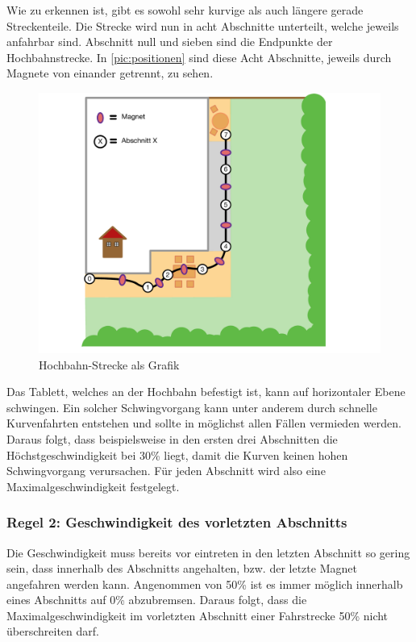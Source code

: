 Wie zu erkennen ist, gibt es sowohl sehr kurvige als auch längere gerade Streckenteile. Die Strecke wird nun in acht Abschnitte unterteilt, welche jeweils anfahrbar sind. Abschnitt null und sieben sind die Endpunkte der Hochbahnstrecke.  In \autoref{pic:positionen} sind diese Acht Abschnitte, jeweils durch Magnete von einander getrennt, zu sehen.
\newpage
\begin{figure}[h]
	\begin{center}
		\includegraphics[width = \textwidth]{Positionen.pdf}
		\caption{\label{pic:positionen} Hochbahn-Strecke als Grafik}
	\end{center}
\end{figure}

Das Tablett, welches an der Hochbahn befestigt ist, kann auf horizontaler Ebene schwingen. Ein solcher Schwingvorgang kann unter anderem durch schnelle Kurvenfahrten entstehen und sollte in möglichst allen Fällen vermieden werden. Daraus folgt, dass beispielsweise in den ersten drei Abschnitten die Höchstgeschwindigkeit bei 30\% liegt, damit die Kurven keinen hohen Schwingvorgang verursachen. Für jeden Abschnitt wird also eine Maximalgeschwindigkeit festgelegt.

\subsubsection{Regel 2: Geschwindigkeit des vorletzten Abschnitts}
Die Geschwindigkeit muss bereits vor eintreten in den letzten Abschnitt so gering sein, dass innerhalb des Abschnitts angehalten, bzw. der letzte Magnet angefahren werden kann. Angenommen von 50\% ist es immer möglich innerhalb eines Abschnitts auf 0\% abzubremsen. Daraus folgt, dass die Maximalgeschwindigkeit im vorletzten Abschnitt einer Fahrstrecke 50\% nicht überschreiten darf. 

